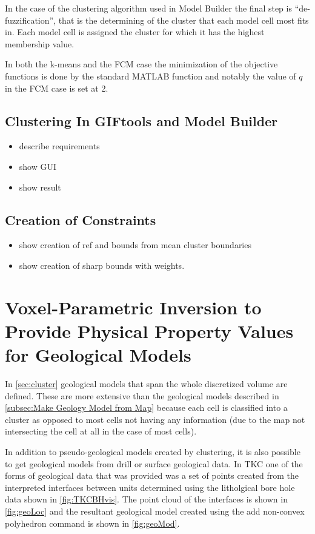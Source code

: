 In the case of the clustering algorithm used in Model Builder the final step is ``de-fuzzification'', that is the determining of the cluster that each model cell most fits in. Each model cell is assigned the cluster for which it has the highest membership value.

In both the k-means and the \ac{FCM} case the minimization of the objective functions is done by the standard MATLAB function and notably the value of $q$ in the \ac{FCM} case is set at 2.

\subsection{Clustering In GIFtools and Model Builder}
\label{subsec:clusterTools}

\begin{itemize}
 \item describe requirements
 \item show GUI
 \item show result
\end{itemize}

\subsection{Creation of Constraints}
\label{subsec:clusterConstraints}

\begin{itemize}
 \item show creation of ref and bounds from mean cluster boundaries
 \item show creation of sharp bounds with weights.
\end{itemize}

\section{Voxel-Parametric Inversion to Provide Physical Property Values for Geological Models}
\label{sec:voxelParam}

In \autoref{sec:cluster} geological models that span the whole discretized volume are defined. These are more extensive than the geological models described in \autoref{subsec:Make Geology Model from Map} because each cell is classified into a cluster as opposed to most cells not having any information (due to the map not intersecting the cell at all in the case of most cells).

In addition to pseudo-geological models created by clustering, it is also possible to get geological models from drill or surface geological data. In TKC one of the forms of geological data that was provided was a set of points created from the interpreted interfaces between units determined using the litholgical bore hole data shown in \autoref{fig:TKCBHvis}. The point cloud of the interfaces is shown in \autoref{fig:geoLoc} and the resultant geological model created using the add non-convex polyhedron command is shown in \autoref{fig:geoMod}.

